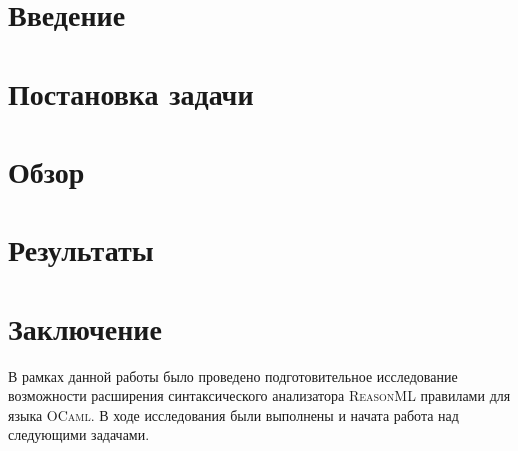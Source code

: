 
\usepackage{newfloat,caption,float}
\usepackage{newfloat}
\usepackage{subcaption}

\captionsetup[example]{labelfont=bf}


\captionsetup[subexample]{labelformat=simple}

\newcommand{\ReasonML}{\textsc{ReasonML}}
\newcommand{\OCaml}{\textsc{OCaml}}
\newcommand{\ocamllex}{\textsc{ocamllex}}
\newcommand{\ocamlyacc}{\textsc{ocamlyacc}}
\newcommand{\merlin}{\textsc{merlin}}





\maketitle
\setcounter{tocdepth}{2}
\tableofcontents

\section{Введение}


\section{Постановка задачи}
\label{sec:task}


\section{Обзор}


\section{Результаты}


\section{Заключение}
В рамках данной работы было проведено подготовительное исследование возможности расширения синтаксического анализатора \ReasonML{} правилами для языка \OCaml{}. В ходе исследования были выполнены и начата работа над следующими задачами.


